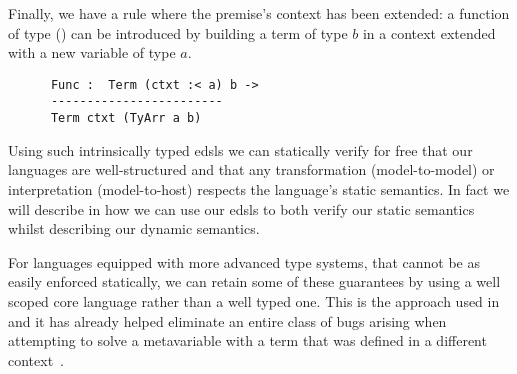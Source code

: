 Finally, we have a rule where the premise's context has been extended:
a function of type () can be introduced by building a term
of type $b$ in a context extended with a new variable of type $a$.

\begin{center}
  \begin{minipage}{0.35\textwidth}
    \inferenceFunc
  \end{minipage}\hfill
  \begin{minipage}{0.55\textwidth}
    \begin{Verbatim}
      Func :  Term (ctxt :< a) b ->
      ------------------------
      Term ctxt (TyArr a b)
    \end{Verbatim}
  \end{minipage}
\end{center}






\noindent
Using such intrinsically typed \acp{edsl} we can statically verify for free
that our languages are well-structured and that any transformation (model-to-model)
or interpretation (model-to-host) respects the language's static semantics.
%
In fact we will describe in  how we can use our \acp{edsl}
to both verify our static semantics whilst describing our dynamic semantics.

For languages equipped with more advanced type systems, that cannot be as easily
enforced statically, we can retain some of these guarantees by using a well
scoped core language rather than a well typed one.
%
This is the approach used in \Idris{} and it has already helped eliminate an
entire class of bugs arising when attempting to solve a metavariable with a
term that was defined in a different context~\cite{DBLP:conf/ecoop/Brady21}.
